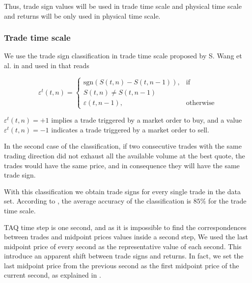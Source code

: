 Thus, trade sign values will be used in trade time scale and physical time
scale and returns will be only used in physical time scale.

\subsubsection{Trade time scale}\label{subsubsec:trade_time}

We use the trade sign classification in trade time scale proposed by S. Wang et
al. in \cite{Wang_2016_cross} and used in
\cite{Wang_2016_avg,Wang_2017,Wang_2018_copulas} that reads

\begin{equation}\label{eq:trade_signs_trade}
    \varepsilon^{t}\left(t,n\right)=\left\{
    \begin{array}{cc}
    \text{sgn}\left(S\left(t,n\right)-S\left(t,n-1\right)\right),
    & \text{if }\\ S\left(t,n\right) \ne S\left(t,n-1\right)\\
    \varepsilon\left(t,n-1\right),
    & \text{otherwise}
    \end{array}\right.
\end{equation}

$\varepsilon^{t}\left( t,n \right) = +1$ implies a trade triggered by a market
order to buy, and a value $\varepsilon^{t}\left( t,n \right) = -1$ indicates a
trade triggered by a market order to sell.

In the second case of the classification, if two consecutive trades with the
same trading direction did not exhaust all the available volume at the best
quote, the trades would have the same price, and in consequence they will have
the same trade sign.

With this classification we obtain trade signs for every single trade in the
data set. According to \cite{Wang_2016_cross}, the average accuracy of the
classification is $85\%$ for the trade time scale.

TAQ time step is one second, and as it is impossible to find the
correspondences between trades and midpoint prices values inside a second step,
We used the last midpoint price of every second as the representative value of
each second. This introduce an apparent shift between trade signs and returns.
In fact, we set the last midpoint price from the previous second as the first
midpoint price of the current second, as explained in \cite{Wang_2016_cross}.

